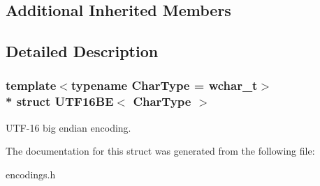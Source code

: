 \subsection*{Additional Inherited Members}


\subsection{Detailed Description}
\subsubsection*{template$<$typename Char\+Type = wchar\+\_\+t$>$\\*
struct U\+T\+F16\+B\+E$<$ Char\+Type $>$}

U\+T\+F-\/16 big endian encoding. 

The documentation for this struct was generated from the following file\+:\begin{DoxyCompactItemize}
\item 
encodings.\+h\end{DoxyCompactItemize}
